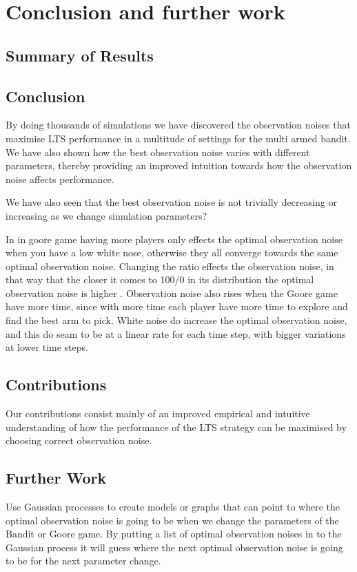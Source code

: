 \chapter{Conclusion and further work}
\label{ch:conclusion}

\section{Summary of Results}

\section{Conclusion}

By doing thousands of simulations we have discovered the observation noises that maximise LTS performance in a multitude of settings for the multi armed bandit.
We have also shown how the best observation noise varies with different parameters, thereby providing an improved intuition towards how the observation noise affects performance.

We have also seen that the best observation noise is not trivially decreasing or increasing as we change simulation parameters?

In in goore game having more players only effects the optimal observation noise when you have a low white nose,
otherwise they all converge towards the same optimal observation noise. Changing the ratio effects the observation
noise, in that way that the closer it comes to 100/0 in its distribution the optimal observation noise is higher .
Observation noise also rises when the Goore game have more time, since with more time each player have more time to explore
and find the best arm to pick. White noise do increase the optimal observation noise, and this do seam to be at a
linear rate for each time step, with bigger variations at lower time steps.

\section{Contributions}
Our contributions consist mainly of an improved empirical and intuitive understanding of how the performance of the LTS strategy can be maximised by choosing correct observation noise.


\section{Further Work}
Use Gaussian processes to create models or graphs that can point to where the optimal observation noise is going to be
when we change the parameters of the Bandit or Goore game. By putting a list of optimal observation noises in to the
Gaussian process it will guess where the next optimal observation noise is going to be for the next parameter change.

